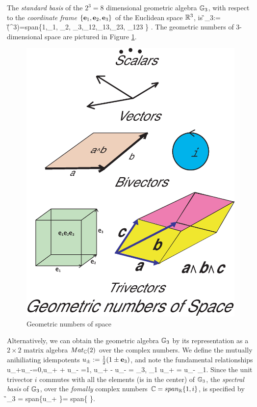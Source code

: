 \documentclass[]{article}
\begin{document}
The {\it standard basis} of the $2^3=8$ dimensional geometric algebra $\mathbb{G}_3$,
 with respect to the {\it coordinate frame} $\{\mathbf{e}_1,\mathbf{e}_2,\mathbf{e}_3\}$ of
the Euclidean space $\mathbb{R}^3$, is
\beq \G_3:=\G(\R^3)=span\{1,\be_1, \be_2, \be_3,\be_{12},\be_{13},\be_{23}, \be_{123} \} . \label{geospace} \eeq
The geometric numbers of $3$-dimensional space are pictured in Figure \ref{picbasis}.
 \begin{figure}
\begin{center}
\includegraphics[scale=.25]{geonumbers3.eps}
\caption{Geometric numbers of space}
\label{picbasis}
\end{center}
\end{figure}   

 Alternatively, we can obtain the geometric algebra $\mathbb{G}_3$ by its representation as a
$2\times 2$ matrix algebra $Mat_{\mathbb{C}}(2)$ over the complex numbers. 
We define the mutually anihiliating idempotents $u_\pm := \frac{1}{2}(1 \pm \mathbf{e}_3)$,
and note the fundamental relationships 
\beq u_+u_-=0,\quad u_+ + u_- =1, \quad u_+ - u_- = \be_3,  \quad  \be_1 u_+ = u_- \be_1. \label{funrelations} \eeq
 Since the unit trivector $i$ commutes
with all the elements (is in the center) of $\mathbb{G}_3$, 
the {\it spectral basis} of $\mathbb{G}_3$, over the {\it fomally} complex numbers $\mathbb{C}=span_{\mathbb{R}}\{1,i\}$, is specified by
\beq \G_3 = span\{u_+ \}= span\{  \}. \label{specbasis3} \eeq
                                            
\end{document}
